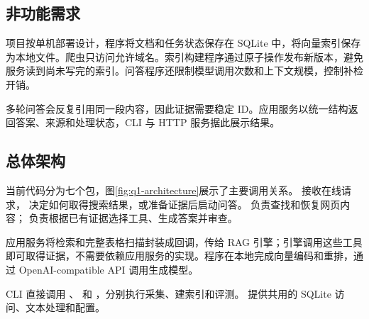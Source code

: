 \documentclass[UTF8,zihao=-4,fontset=fandol]{ctexart}
\begin{document}
\subsection{非功能需求}

项目按单机部署设计，程序将文档和任务状态保存在 SQLite 中，将向量索引保存为本地文件。爬虫只访问允许域名。索引构建程序通过原子操作发布新版本，避免服务读到尚未写完的索引。问答程序还限制模型调用次数和上下文规模，控制补检开销。

多轮问答会反复引用同一段内容，因此证据需要稳定 ID。应用服务以统一结构返回答案、来源和处理状态，CLI 与 HTTP 服务据此展示结果。

\subsection{总体架构}

当前代码分为七个包，图\ref{fig:q1-architecture}展示了主要调用关系。 接收在线请求， 决定如何取得搜索结果，或准备证据后启动问答。 负责查找和恢复网页内容； 负责根据已有证据选择工具、生成答案并审查。

应用服务将检索和完整表格扫描封装成回调，传给 RAG 引擎；引擎调用这些工具即可取得证据，不需要依赖应用服务的实现。程序在本地完成向量编码和重排，通过 OpenAI-compatible API 调用生成模型。

CLI 直接调用 、 和 ，分别执行采集、建索引和评测。 提供共用的 SQLite 访问、文本处理和配置。
\end{document}
